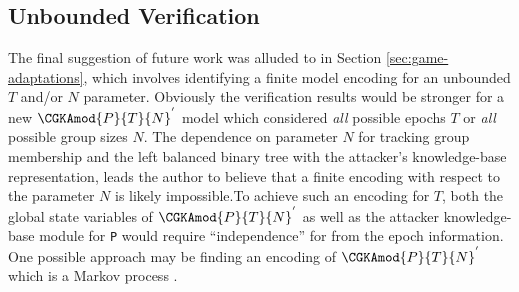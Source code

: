 \hypertarget{sec:unbounded-verification}{%
\subsection{Unbounded Verification}\label{sec:unbounded-verification}}

The final suggestion of future work was alluded to in Section \ref{sec:game-adaptations}, which involves identifying a finite model encoding for an unbounded \(T\) and/or \(N\) parameter.
Obviously the verification results would be stronger for a new \( \CGKAmod{P}{T}{N}^{'} \) model which considered \emph{all} possible epochs \(T\) or \emph{all} possible group sizes \(N\).
The dependence on parameter \(N\) for tracking group membership and the left balanced binary tree with the attacker's knowledge-base representation, leads the author to believe that a finite encoding with respect to the parameter \(N\) is likely impossible.To achieve such an encoding for \(T\), both the global state variables of \( \CGKAmod{P}{T}{N}^{'} \) as well as the attacker knowledge-base module for \texttt{P} would require ``independence'' for from the epoch information.
One possible approach may be finding an encoding of \( \CGKAmod{P}{T}{N}^{'} \) which is a Markov process \autocite{markov1906a}.
